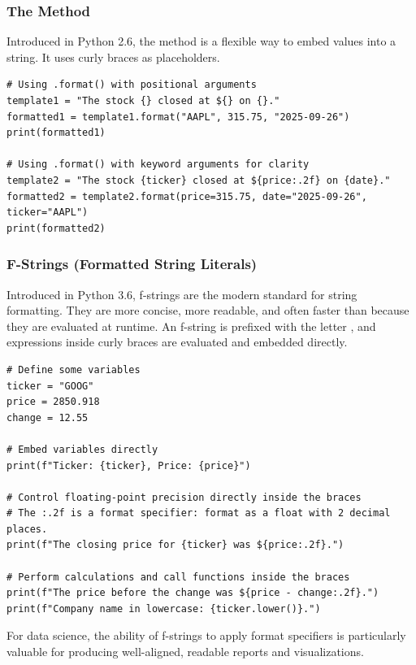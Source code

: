 \subsubsection*{The  Method}
Introduced in Python 2.6, the  method is a flexible way to embed values into a string. It uses curly braces \code{\{\}} as placeholders.

\text{ }\begin{verbatim}
# Using .format() with positional arguments
template1 = "The stock {} closed at ${} on {}."
formatted1 = template1.format("AAPL", 315.75, "2025-09-26")
print(formatted1)

# Using .format() with keyword arguments for clarity
template2 = "The stock {ticker} closed at ${price:.2f} on {date}."
formatted2 = template2.format(price=315.75, date="2025-09-26", ticker="AAPL")
print(formatted2)
\end{verbatim}

\subsubsection*{F-Strings (Formatted String Literals)}
Introduced in Python 3.6, f-strings are the modern standard for string formatting. They are more concise, more readable, and often faster than  because they are evaluated at runtime. An f-string is prefixed with the letter , and expressions inside curly braces \code{\{\}} are evaluated and embedded directly.

\begin{example}
\text{ }\begin{verbatim}
# Define some variables
ticker = "GOOG"
price = 2850.918
change = 12.55

# Embed variables directly
print(f"Ticker: {ticker}, Price: {price}")

# Control floating-point precision directly inside the braces
# The :.2f is a format specifier: format as a float with 2 decimal places.
print(f"The closing price for {ticker} was ${price:.2f}.")

# Perform calculations and call functions inside the braces
print(f"The price before the change was ${price - change:.2f}.")
print(f"Company name in lowercase: {ticker.lower()}.")
\end{verbatim}
\end{example}
For data science, the ability of f-strings to apply format specifiers is particularly valuable for producing well-aligned, readable reports and visualizations.


